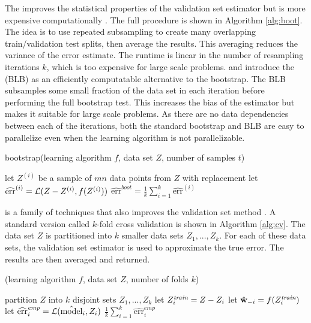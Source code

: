 \documentclass[thesis.tex]{subfiles}
\newcommand{\TO}{{\bfseries to}~}
\newcommand{\model}{\hat{\text{model}}}
\newcommand{\riskhat}{\widehat{\textrm{err}}}
\newcommand{\riskemp}{\widehat{\textrm{err}}^\textit{emp}}
\newcommand{\riskboot}{\widehat{\textrm{err}}^\textit{boot}}
\newcommand{\cv}{\mkprocedure{cv}}
\begin{document}
The  improves the statistical properties of the validation set estimator but is more expensive computationally \citep{efron1979bootstrap}.
The full procedure is shown in Algorithm \ref{alg:boot}.
The idea is to use repeated subsampling to create many overlapping train/validation test splits,
then average the results.
This averaging reduces the variance of the error estimate.
The runtime is linear in the number of resampling iterations $k$,
which is too expensive for large scale problems.
\citet{kleiner2012big} and \citet{kleiner2014scalable} introduce the  (BLB) as an efficiently computatable alternative to the bootstrap.
The BLB subsamples some small fraction of the data set in each iteration before performing the full bootstrap test.
This increases the bias of the estimator but makes it suitable for large scale problems.
As there are no data dependencies between each of the iterations,
both the standard bootstrap and BLB are easy to parallelize even when the learning algorithm is not parallelizable.

\begin{algorithm}[t]
    \caption{bootstrap(learning algorithm $f$, data set $Z$, number of samples $t$)}
    \label{alg:boot}
    \vspace{0.1in}
    \begin{algorithmic}[1]
        \For {$i=1$ \TO $k$}
            \State let $Z^{(i)}$ be a sample of $mn$ data points from $Z$ with replacement
            \State let $\riskhat^{(i)} = \Loss(Z-Z^{(i)},f(Z^{(i)}))$
        \EndFor
        \State \Return $\riskboot = \frac 1 k \sum_{i=1}^k \riskhat^{(i)}$
    \end{algorithmic}
\end{algorithm}

 is a family of techniques that also improves the validation set method
\cite[see][for a survey]{arlot2010survey}.
A standard version called $k$-fold cross validation is shown in Algorithm \ref{alg:cv}.
The data set $Z$ is partitioned into $k$ smaller data sets $Z_1,...,Z_k$.
For each of these data sets, the validation set estimator is used to approximate the true error.
The results are then averaged and returned.

\begin{algorithm}[t]
    \caption{\cv(learning algorithm $f$, data set $Z$, number of folds $k$)}
    \label{alg:cv}
    \vspace{0.1in}
    \begin{algorithmic}[1]
        \State partition $Z$ into $k$ disjoint sets $Z_1,...,Z_k$
            \State let $Z^\textit{train}_i = Z-Z_i$
            \State let ${\hat{\mathbf w}}_{-i} = f(Z^\textit{train}_i)$ 
            \State let $\riskemp_i = \Loss(\model_i,Z_i)$
        \EndFor
        \State \Return $\frac 1 k \sum_{i=1}^k \riskemp_i$
    \end{algorithmic}
\end{algorithm}
\end{document}
